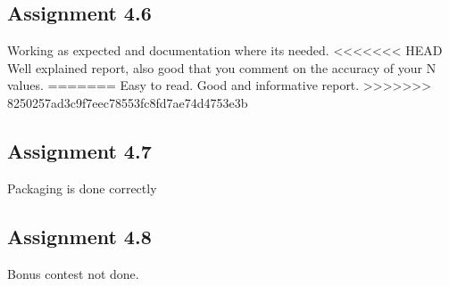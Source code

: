 \documentclass[a4paper]{article}
\begin{document}
\subsection*{Assignment 4.6}

Working as expected and documentation where its needed.
<<<<<<< HEAD
Well explained report, also good that you comment on the accuracy of your N values.
=======
Easy to read. Good and informative report.
>>>>>>> 8250257ad3c9f7eec78553fc8fd7ae74d4753e3b

\subsection*{Assignment 4.7}
Packaging is done correctly

\subsection*{Assignment 4.8}
Bonus contest not done.



\end{document}
